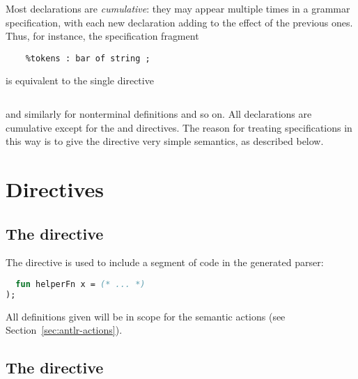 Most \antlr{} declarations are \emph{cumulative}: they may appear multiple times in a grammar specification, with each new declaration adding to the effect of the previous ones.  Thus, for instance, the specification fragment
\begin{lstlisting}[language=MLAntlr]
    %tokens : foo ;
    %tokens : bar of string ;
\end{lstlisting}%
is equivalent to the single directive
\begin{lstlisting}[language=MLAntlr]
    %tokens : foo | bar of string ;
\end{lstlisting}%
and similarly for nonterminal definitions and so on.  All declarations are cumulative except for the  and  directives.
The reason for treating specifications in this way is to give the  directive very simple semantics, as described below.

\section{Directives}

\subsection{The  directive}

The  directive is used to include a segment of code in the generated parser:  
\begin{lstlisting}[language=SML]
%defs (
  fun helperFn x = (* ... *)
);
\end{lstlisting}%
All definitions given will be in scope for the semantic actions (see Section~\ref{sec:antlr-actions}).

\subsection{The  directive}

